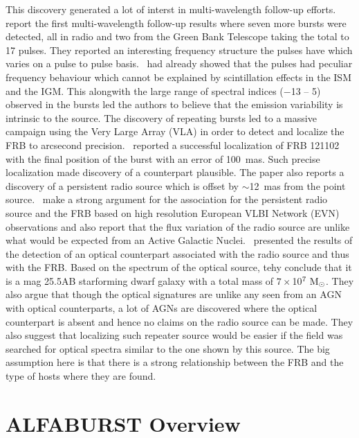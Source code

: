 \documentclass[a4paper,fleqn,usenatbib]{mnras}
\begin{document}
 This discovery generated a lot of interst in multi-wavelength
follow-up efforts.~\cite{2016ApJ...833..177S} report the first multi-wavelength
follow-up results where seven more bursts were detected, all in radio and two
from the Green Bank Telescope taking the total to 17 pulses. They reported an interesting frequency structure the pulses have which varies on a pulse to pulse basis.~\cite{2016Natur.531..202S} had already showed that the
pulses had peculiar frequency behaviour which cannot be explained by
scintillation effects in the ISM and the IGM. This alongwith the large range
of spectral indices ($-$13 -- 5) observed in the bursts led the authors to
believe that the emission variability is intrinsic to the source. The
discovery of repeating bursts led to a massive campaign using the Very Large
Array (VLA) in order to detect and localize the FRB to arcsecond precision.~\cite{2017Natur.541...58C} reported a successful localization of FRB 121102 with
the final position of the burst with an error of 100~mas. Such
precise localization made discovery of a counterpart plausible. The paper also
reports a discovery of a persistent radio source which is offset by $\sim$12~mas from the point source.~\cite{2017ApJ...834L...8M} make a strong argument for the association for the persistent radio source and the FRB based on high resolution European VLBI Network (EVN) observations and also report that the flux variation of the radio source are
unlike what would be expected from an Active Galactic Nuclei.~\cite{2017ApJ...834L...7T} presented the results of the detection of an optical counterpart associated
with the radio source and thus with the FRB. Based on the spectrum of the
optical source, tehy conclude that it is a mag 25.5AB starforming dwarf
galaxy with a total mass of $7 \times$10$^{7}~\rm M_{\odot}$. They also argue that though the optical signatures are unlike any seen
from an AGN with optical counterparts, a lot of AGNs are discovered where the optical counterpart is
absent and hence no claims
on the radio source can be made. They also suggest that localizing such
repeater source would be easier if the field was searched for optical spectra
similar to the one shown by this source. The big assumption here is that there
is a strong relationship between the FRB and the type of hosts where they are
found.

\section{ALFABURST Overview}
\label{sec:overview}
\end{document}
